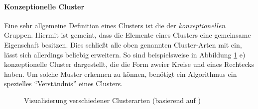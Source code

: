 \paragraph{Konzeptionelle Cluster}
Eine sehr allgemeine Definition eines Clusters ist die der \textit{konzeptionellen} Gruppen. Hiermit ist
gemeint, dass die Elemente eines Clusters eine gemeinsame Eigenschaft besitzen. Dies schließt alle oben genannten
Cluster-Arten mit ein, lässt sich allerdings beliebig erweitern. So sind beispielsweise in Abbildung \ref{fig:basic_cluster_style} e)
konzeptionelle Cluster dargestellt, die die Form zweier Kreise und eines Rechtecks haben. Um solche Muster
erkennen zu können, benötigt ein Algorithmus ein spezielles ``Verständnis'' eines Clusters.

\begin{figure}[H]
    \centering
    \qquad
    \qquad
    \hfill
    \qquad
    \qquad
    \hfill
    \caption[Visualisierung verschiedener Clusterarten]
            {Visualisierung verschiedener Clusterarten (basierend auf \cite[]{tan2007introduction})}
    \label{fig:basic_cluster_style}
\end{figure}


